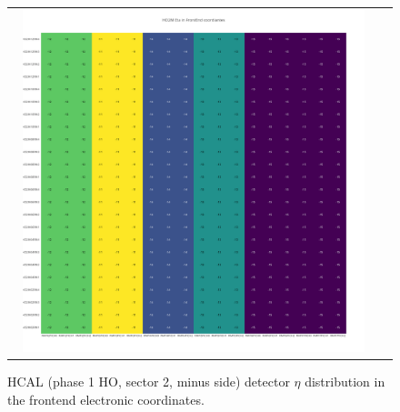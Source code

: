 \begin{figure}[htb]
 \begin{center}
  \begin{tabular}{cc}
   \includegraphics[angle=0,width=0.95\textwidth]{figures/appendix/HO2M_Eta_in_FrontEnd.png}
  \end{tabular}
  \caption{HCAL (phase 1 HO, sector 2, minus side) detector $\eta$ distribution in the frontend electronic coordinates.}
  \label{fig:lmapHO2MEtaFEC}
 \end{center}
\end{figure}
\clearpage

